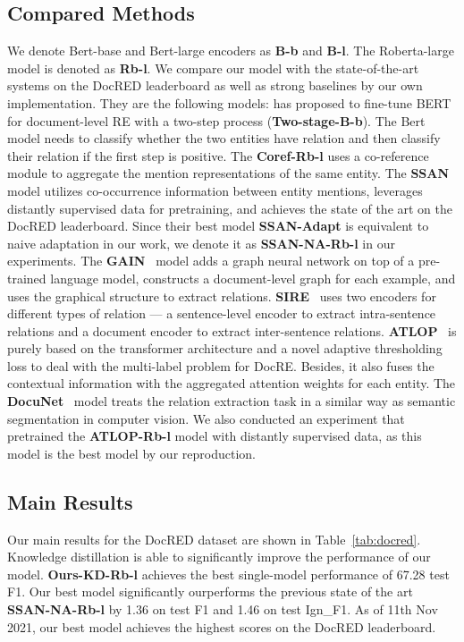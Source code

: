 \documentclass[11pt]{article}
\begin{document}
\subsection{Compared Methods}
We denote Bert-base and Bert-large encoders as \textbf{B-b} and \textbf{B-l}. The Roberta-large model is denoted as \textbf{Rb-l}. We compare our model with the state-of-the-art systems on the DocRED leaderboard as well as strong baselines by our own implementation. They are the following models: \citet{wang2019fine} has proposed to fine-tune BERT for document-level RE with a two-step process (\textbf{Two-stage-B-b}). The Bert model needs to classify whether the two entities have relation and then classify their relation if the first step is positive. The \textbf{Coref-Rb-l} \citep{ye2020coreferential} uses a co-reference module to aggregate the mention representations of the same entity. The \textbf{SSAN}~\citep{xu2021entity} model utilizes co-occurrence information between entity mentions, leverages distantly supervised data for pretraining, and achieves the state of the art on the DocRED leaderboard. Since their best model \textbf{SSAN-Adapt} is equivalent to naive adaptation in our work, we denote it as \textbf{SSAN-NA-Rb-l} in our experiments. The \textbf{GAIN}~\citep{zeng2020double} model adds a graph neural network on top of a pre-trained language model, constructs a document-level graph for each example, and uses the graphical structure to extract relations. \textbf{SIRE}~\citep{zeng2021sire} uses two encoders for different types of relation --- a sentence-level encoder to extract intra-sentence relations and a document encoder to extract inter-sentence relations. \textbf{ATLOP}~\citep{zhou2021document} is purely based on the transformer architecture and a novel adaptive thresholding loss to deal with the multi-label problem for DocRE. Besides, it also fuses the contextual information with the aggregated attention weights for each entity. The \textbf{DocuNet}~\citep{zhang2021document} model treats the relation extraction task in a similar way as semantic segmentation in computer vision. We also conducted an experiment that pretrained the \textbf{ATLOP-Rb-l} model with distantly supervised data, as this model is the best model by our reproduction. 



\subsection{Main Results}
Our main results for the DocRED dataset are shown in Table~\ref{tab:docred}. Knowledge distillation is able to significantly improve the performance of our model. \textbf{Ours-KD-Rb-l} achieves the best single-model performance of 67.28 test F1. Our best model significantly ourperforms the previous state of the art \textbf{SSAN-NA-Rb-l} by 1.36 on test F1 and 1.46 on test Ign\_F1. As of 11th Nov 2021, our best model achieves the highest scores on the DocRED leaderboard.
\end{document}
